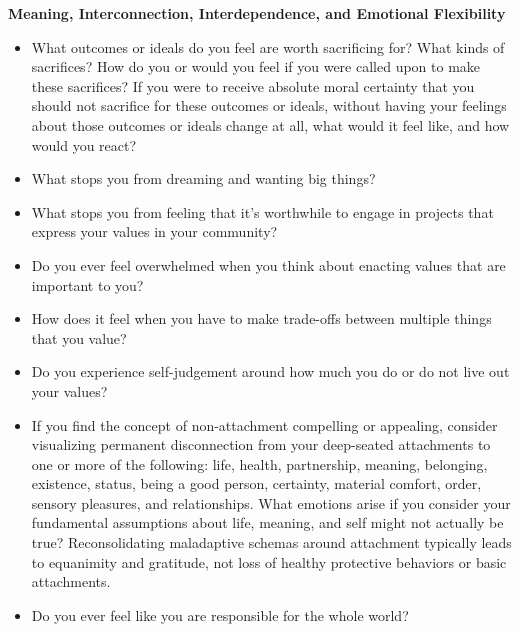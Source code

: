 \documentclass[12pt,letterpaper]{book}
\begin{document}
\noindent \textbf{Meaning, Interconnection, Interdependence, and Emotional Flexibility }
\begin{itemize}
    \item What outcomes or ideals do you feel are worth sacrificing for? What kinds of sacrifices? How do you or would you feel if you were called upon to make these sacrifices? If you were to receive absolute moral certainty that you should not sacrifice for these outcomes or ideals, without having your feelings about those outcomes or ideals change at all, what would it feel like, and how would you react?
    \item What stops you from dreaming and wanting big things?
    \item What stops you from feeling that it's worthwhile to engage in projects that express your values in your community?
    \item Do you ever feel overwhelmed when you think about enacting values that are important to you?
    \item How does it feel when you have to make trade-offs between multiple things that you value?
    \item Do you experience self-judgement around how much you do or do not live out your values?
    \item If you find the concept of non-attachment compelling or appealing, consider visualizing permanent disconnection from your deep-seated attachments to one or more of the following: life, health, partnership, meaning, belonging, existence, status, being a good person, certainty, material comfort, order, sensory pleasures, and relationships. What emotions arise if you consider your fundamental assumptions about life, meaning, and self might not actually be true? Reconsolidating maladaptive schemas around attachment typically leads to equanimity and gratitude, not loss of healthy protective behaviors or basic attachments.
    \item Do you ever feel like you are responsible for the whole world?
\end{itemize}
\end{document}
